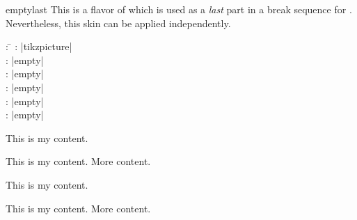 \clearpage
\begin{docSkin}{emptylast}
This is a flavor of  which is used as a \emph{last} part
in a break sequence for .
Nevertheless, this skin can be applied independently.
\begin{tcolorbox}[skintable=emptylast]
  \begin{tabbing}
    : \=\kill
    :  \> |tikzpicture|\\ 
    :           \> |empty|\\
    : \> |empty|\\ 
    :        \> |empty|\\
    :    \> |empty|\\
    :           \> |empty|
  \end{tabbing}
\end{tcolorbox}
\end{docSkin}

\begin{dispExample}
\begin{tcbraster}[empty,skin=emptylast,raster equal height,raster columns=4,
    coltitle=Navy,borderline={2pt}{0pt}{black!10!white},
    left=1mm,right=1mm,top=1mm,bottom=1mm,middle=1mm]
  \begin{tcolorbox}
    This is my content.
  \end{tcolorbox}
  \begin{tcolorbox}
    This is my content.
    \tcblower
    More content.
  \end{tcolorbox}
  \begin{tcolorbox}[adjusted title=My title]
    This is my content.
  \end{tcolorbox}
  \begin{tcolorbox}[adjusted title=My title]
    This is my content.
    \tcblower
    More content.
  \end{tcolorbox}
\end{tcbraster}
\end{dispExample}

